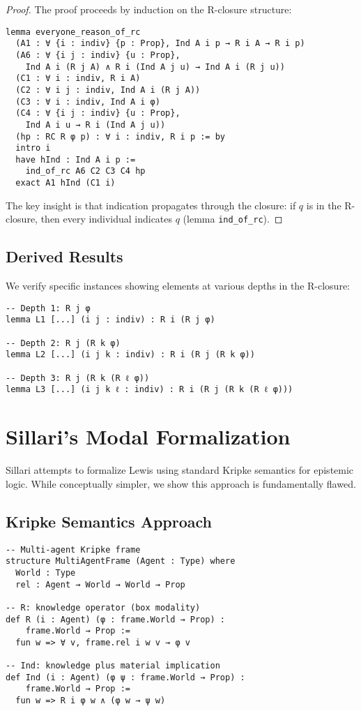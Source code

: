 \documentclass[11pt]{article}
\begin{document}
\begin{proof}
The proof proceeds by induction on the R-closure structure:

\begin{verbatim}
lemma everyone_reason_of_rc
  (A1 : ∀ {i : indiv} {p : Prop}, Ind A i p → R i A → R i p)
  (A6 : ∀ {i j : indiv} {u : Prop}, 
    Ind A i (R j A) ∧ R i (Ind A j u) → Ind A i (R j u))
  (C1 : ∀ i : indiv, R i A)
  (C2 : ∀ i j : indiv, Ind A i (R j A))
  (C3 : ∀ i : indiv, Ind A i φ)
  (C4 : ∀ {i j : indiv} {u : Prop}, 
    Ind A i u → R i (Ind A j u))
  (hp : RC R φ p) : ∀ i : indiv, R i p := by
  intro i
  have hInd : Ind A i p := 
    ind_of_rc A6 C2 C3 C4 hp
  exact A1 hInd (C1 i)
\end{verbatim}

The key insight is that indication propagates through the closure: if $q$ is in 
the R-closure, then every individual indicates $q$ (lemma \texttt{ind\_of\_rc}).
\end{proof}

\subsection{Derived Results}

We verify specific instances showing elements at various depths in the R-closure:

\begin{verbatim}
-- Depth 1: R j φ
lemma L1 [...] (i j : indiv) : R i (R j φ)

-- Depth 2: R j (R k φ)  
lemma L2 [...] (i j k : indiv) : R i (R j (R k φ))

-- Depth 3: R j (R k (R ℓ φ))
lemma L3 [...] (i j k ℓ : indiv) : R i (R j (R k (R ℓ φ)))
\end{verbatim}

\section{Sillari's Modal Formalization}

Sillari attempts to formalize Lewis using standard Kripke semantics for epistemic 
logic. While conceptually simpler, we show this approach is fundamentally flawed.

\subsection{Kripke Semantics Approach}

\begin{verbatim}
-- Multi-agent Kripke frame
structure MultiAgentFrame (Agent : Type) where
  World : Type
  rel : Agent → World → World → Prop

-- R: knowledge operator (box modality)
def R (i : Agent) (φ : frame.World → Prop) : 
    frame.World → Prop :=
  fun w => ∀ v, frame.rel i w v → φ v

-- Ind: knowledge plus material implication
def Ind (i : Agent) (φ ψ : frame.World → Prop) : 
    frame.World → Prop :=
  fun w => R i φ w ∧ (φ w → ψ w)
\end{verbatim}
\end{document}
